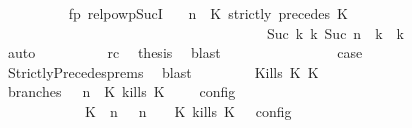 \begin{isabellebody}
\ \ \ \ \ \ \ \ \isamarkupfalse%
\ fp\ relpowp{\isacharunderscore}Suc{\isacharunderscore}I{}\ \isamarkupfalse%
\ {\isacartoucheopen}{\isacharparenleft}{\isasymGamma}{\isacharcomma}\ n\ {\isasymturnstile}\ {\isacharparenleft}{\isacharparenleft}K\ strictly\ precedes\ K\ {\isacharhash}\ {\isasymPsi}{\isacharparenright}\ {\isasymtriangleright}\ {\isasymPhi}{\isacharparenright}\isanewline
\ \ \ \ \ \ \ \ \ \ \ \ \ \ \ \ \ \ \ \ \ \ \ \ \ \ \ \ \ \ \ \ \ \ \ \ \ \ {\isasymhookrightarrow}\isactrlbsup Suc\ k\isactrlesup \ {\isacharparenleft}{\isasymGamma}\isactrlsub k{\isacharcomma}\ Suc\ n\ {\isasymturnstile}\ {\isasymPsi}\isactrlsub k\ {\isasymtriangleright}\ {\isasymPhi}\isactrlsub k{\isacharparenright}{\isacartoucheclose}\isanewline
\ \ \ \ \ \ \ \ \ \ \isamarkupfalse%
\ auto\isanewline
\ \ \ \ \ \ \ \ \isamarkupfalse%
\ rc\ \isamarkupfalse%
\ {\isacharquery}thesis\ \isamarkupfalse%
\ blast\isanewline
\ \ \ \ \ \ \isamarkupfalse%
\isanewline
\ \ \ \ \ \ \isamarkupfalse%
\ \isamarkupfalse%
\ {\isacharquery}case\ \isamarkupfalse%
\ StrictlyPrecedes{\isachardot}prems{\isacharparenleft}{}{\isacharparenright}\ \isamarkupfalse%
\ blast\isanewline
\ \ \isamarkupfalse%
\isanewline
\ \ \ \ \isamarkupfalse%
\ {\isacharparenleft}Kills\ K\ K\isanewline
\ \ \ \ \ \ \isamarkupfalse%
\ branches{\isacharcolon}\ {\isacartoucheopen}{\isasymlbrakk}\ {\isasymGamma}{\isacharcomma}\ n\ {\isasymturnstile}\ {\isacharparenleft}{\isacharparenleft}K\ kills\ K\ {\isacharhash}\ {\isasymPsi}{\isacharparenright}\ {\isasymtriangleright}\ {\isasymPhi}\ {\isasymrbrakk}\isactrlsub c\isactrlsub o\isactrlsub n\isactrlsub f\isactrlsub i\isactrlsub g\isanewline
\ \ \ \ \ \ \ \ \ \ {\isacharequal}\ {\isasymlbrakk}\ {\isacharparenleft}{\isacharparenleft}K\ {\isasymnot}{\isasymUp}\ n{\isacharparenright}\ {\isacharhash}\ {\isasymGamma}{\isacharparenright}{\isacharcomma}\ n\ {\isasymturnstile}\ {\isasymPsi}\ {\isasymtriangleright}\ {\isacharparenleft}{\isacharparenleft}K\ kills\ K\ {\isacharhash}\ {\isasymPhi}{\isacharparenright}\ {\isasymrbrakk}\isactrlsub c\isactrlsub o\isactrlsub n\isactrlsub f\isactrlsub i\isactrlsub g\isanewline

\end{isabellebody}
